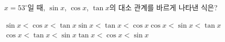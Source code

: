 $x=53^\circ$일 때, $\sin x$, $\cos x$, $\tan x$의 대소 관계를 바르게 나타낸 식은?
\begin{choicesv}{$\sin x<\cos x<\tan x$}{$\sin x<\tan x<\cos x$}{$\cos x<\sin x<\tan x$}{$\cos x<\tan x<\sin x$}{$\tan x<\cos x<\sin x$}\end{choicesv}
